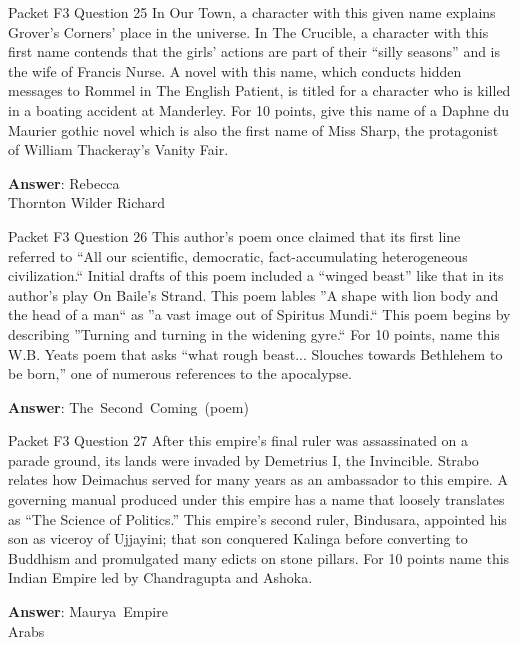 \begin{frame}{Packet F3 Question 25}
In Our Town, a character   with this given name explains Grover’s Corners’ place in the universe. In The Crucible, a character   with this first name contends that the girls’ actions are part of their “silly seasons” and is the wife of Francis Nurse. A novel with this name, which conducts hidden messages to Rommel in The English Patient, is titled for a character who is killed in a boating accident at Manderley. For 10 points, give this name of a Daphne du Maurier     gothic novel which is also the first name of Miss Sharp, the protagonist of William Thackeray's Vanity Fair.

\textbf{Answer}: Rebecca\\
 Thornton Wilder
 Richard
\end{frame}

\begin{frame}{Packet F3 Question 26}
This author's poem once claimed that its first line referred to “All our scientific, democratic, fact-accumulating heterogeneous civilization.`` Initial drafts of this poem included a “winged beast” like that in its author's play On Baile's Strand. This poem lables ''A shape with lion body and the head   of a man`` as ''a vast image out of Spiritus   Mundi.`` This poem begins by describing   ''Turning and turning in the widening gyre.`` For 10 points,   name this W.B. Yeats poem that asks “what rough beast... Slouches towards Bethlehem to be born,'' one of numerous references to the apocalypse.

\textbf{Answer}: The\ Second\ Coming\ (poem)\\
\end{frame}

\begin{frame}{Packet F3 Question 27}
After this empire's final   ruler was assassinated on a parade ground, its lands were invaded by Demetrius I, the Invincible.   Strabo relates how Deimachus served for many years as an ambassador to this empire. A governing manual produced under this empire has a name that loosely translates as ``The Science of Politics.'' This empire's second ruler, Bindusara, appointed his son as viceroy of Ujjayini; that son conquered Kalinga before converting to Buddhism and promulgated     many edicts on stone pillars.   For 10 points name this Indian Empire led by Chandragupta and Ashoka.

\textbf{Answer}: Maurya\ Empire\\
 Arabs
\end{frame}

